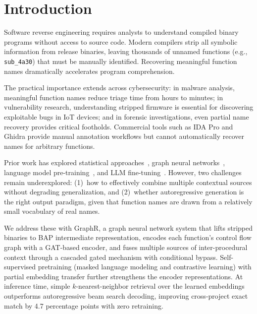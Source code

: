 \documentclass[sigconf,nonacm]{acmart}
\newcommand{\sysname}{\textsf{GraphR}}
\begin{document}

\maketitle
\hypersetup{colorlinks=true,linkcolor=blue,citecolor=blue,urlcolor=blue}

\section{Introduction}
\label{sec:intro}

Software reverse engineering requires analysts to understand compiled binary programs without access to source code. Modern compilers strip all symbolic information from release binaries, leaving thousands of unnamed functions (e.g., \texttt{sub\_4a30}) that must be manually identified. Recovering meaningful function names dramatically accelerates program comprehension.

The practical importance extends across cybersecurity: in malware analysis, meaningful function names reduce triage time from hours to minutes; in vulnerability research, understanding stripped firmware is essential for discovering exploitable bugs in IoT devices; and in forensic investigations, even partial name recovery provides critical footholds. Commercial tools such as IDA Pro and Ghidra provide manual annotation workflows but cannot automatically recover names for arbitrary functions.

Prior work has explored statistical approaches~\cite{debin}, graph neural networks~\cite{nero}, language model pre-training~\cite{symlm}, and LLM fine-tuning~\cite{symgen}. However, two challenges remain underexplored: (1)~how to effectively combine multiple contextual sources without degrading generalization, and (2)~whether autoregressive generation is the right output paradigm, given that function names are drawn from a relatively small vocabulary of real names.

We address these with \sysname{}, a graph neural network system that lifts stripped binaries to BAP intermediate representation, encodes each function's control flow graph with a GAT-based encoder, and fuses multiple sources of inter-procedural context through a cascaded gated mechanism with conditional bypass. Self-supervised pretraining (masked language modeling and contrastive learning) with partial embedding transfer further strengthens the encoder representations. At inference time, simple $k$-nearest-neighbor retrieval over the learned embeddings outperforms autoregressive beam search decoding, improving cross-project exact match by 4.7 percentage points with zero retraining.
\end{document}
